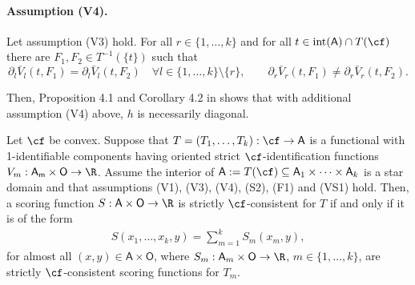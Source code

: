 \paragraph{Assumption (V4).} Let assumption (V3) hold. For all $r \in \{1, \ldots, k\}$ and for all $t \in \mathrm{int}(\mathsf{A}) \cap T(\cf)$ there are $F_1, F_2 \in T^{-1}(\{t\})$ such that
\[
\partial_l \bar{V}_l(t, F_1) = \partial_l \bar{V}_l(t, F_2) \quad \forall l \in \{1, \ldots, k\} \setminus \{r\}, \qquad \partial_r \bar{V}_r(t, F_1) \neq \partial_r \bar{V}_r(t, F_2).
\]

Then, Proposition 4.1 and Corollary 4.2 in \cite{fissler2016multiq} shows that with additional assumption (V4) above, $h$ is necessarily diagonal.
\begin{theorem}
Let $\cf$ be convex. Suppose that $T = (T_1, \ldots, T_k): \cf \to \mathsf{A}$ is a functional with 1-identifiable components having oriented strict $\cf$-identification functions $V_m: \mathsf{A_m} \times \mathsf{O} \to \R$. Assume the interior of $\mathsf{A}:=T(\cf) \subseteq \mathsf{A}_1 \times \cdots \times \mathsf{A}_k$ is a star domain and that assumptions (V1), (V3), (V4), (S2), (F1) and (VS1) hold. Then, a scoring function $S: \mathsf{A} \times \mathsf{O} \to \R$ is strictly $\cf$-consistent for $T$ if and only if it is of the form
\begin{align}
    S(x_1, \ldots, x_k, y) = \sum_{m=1}^{k} S_m(x_m, y),
\end{align}
for almost all $(x,y) \in \mathsf{A} \times \mathsf{O}$, where $S_m: \mathsf{A}_m \times \mathsf{O} \to \R$, $m \in \{1, \ldots, k\}$, are strictly $\cf$-consistent scoring functions for $T_m$.
\end{theorem}



















